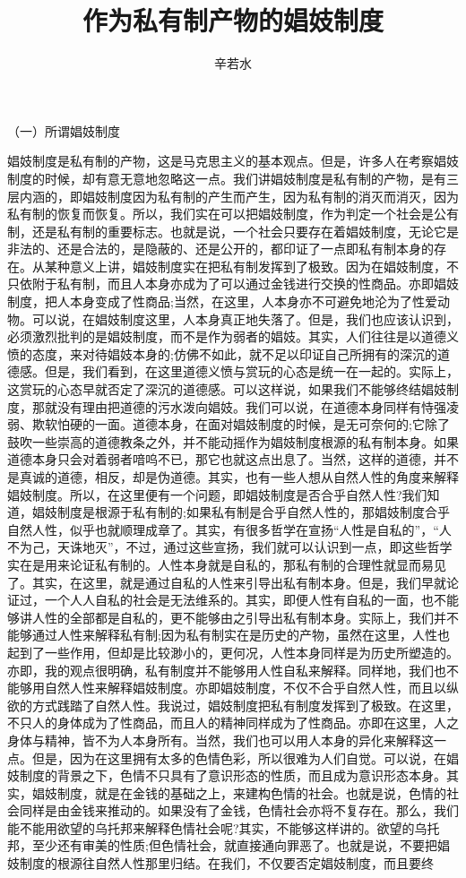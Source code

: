 \documentclass[a4paper]{article}
\date{}
\author{辛若水}
\title{\zihao{-2}\heiti\textbf{作为私有制产物的娼妓制度}}
\begin{document}
    \maketitle

（一）所谓娼妓制度

娼妓制度是私有制的产物，这是马克思主义的基本观点。但是，许多人在考察娼妓制度的时候，却有意无意地忽略这一点。我们讲娼妓制度是私有制的产物，是有三层内涵的，即娼妓制度因为私有制的产生而产生，因为私有制的消灭而消灭，因为私有制的恢复而恢复。所以，我们实在可以把娼妓制度，作为判定一个社会是公有制，还是私有制的重要标志。也就是说，一个社会只要存在着娼妓制度，无论它是非法的、还是合法的，是隐蔽的、还是公开的，都印证了一点即私有制本身的存在。从某种意义上讲，娼妓制度实在把私有制发挥到了极致。因为在娼妓制度，不只依附于私有制，而且人本身亦成为了可以通过金钱进行交换的性商品。亦即娼妓制度，把人本身变成了性商品;当然，在这里，人本身亦不可避免地沦为了性爱动物。可以说，在娼妓制度这里，人本身真正地失落了。但是，我们也应该认识到，必须激烈批判的是娼妓制度，而不是作为弱者的娼妓。其实，人们往往是以道德义愤的态度，来对待娼妓本身的;仿佛不如此，就不足以印证自己所拥有的深沉的道德感。但是，我们看到，在这里道德义愤与赏玩的心态是统一在一起的。实际上，这赏玩的心态早就否定了深沉的道德感。可以这样说，如果我们不能够终结娼妓制度，那就没有理由把道德的污水泼向娼妓。我们可以说，在道德本身同样有恃强凌弱、欺软怕硬的一面。道德本身，在面对娼妓制度的时候，是无可奈何的;它除了鼓吹一些崇高的道德教条之外，并不能动摇作为娼妓制度根源的私有制本身。如果道德本身只会对着弱者喑呜不已，那它也就这点出息了。当然，这样的道德，并不是真诚的道德，相反，却是伪道德。其实，也有一些人想从自然人性的角度来解释娼妓制度。所以，在这里便有一个问题，即娼妓制度是否合乎自然人性?我们知道，娼妓制度是根源于私有制的;如果私有制是合乎自然人性的，那娼妓制度合乎自然人性，似乎也就顺理成章了。其实，有很多哲学在宣扬“人性是自私的”，“人不为己，天诛地灭”，不过，通过这些宣扬，我们就可以认识到一点，即这些哲学实在是用来论证私有制的。人性本身就是自私的，那私有制的合理性就显而易见了。其实，在这里，就是通过自私的人性来引导出私有制本身。但是，我们早就论证过，一个人人自私的社会是无法维系的。其实，即便人性有自私的一面，也不能够讲人性的全部都是自私的，更不能够由之引导出私有制本身。实际上，我们并不能够通过人性来解释私有制;因为私有制实在是历史的产物，虽然在这里，人性也起到了一些作用，但却是比较渺小的，更何况，人性本身同样是为历史所塑造的。亦即，我的观点很明确，私有制度并不能够用人性自私来解释。同样地，我们也不能够用自然人性来解释娼妓制度。亦即娼妓制度，不仅不合乎自然人性，而且以纵欲的方式践踏了自然人性。我说过，娼妓制度把私有制度发挥到了极致。在这里，不只人的身体成为了性商品，而且人的精神同样成为了性商品。亦即在这里，人之身体与精神，皆不为人本身所有。当然，我们也可以用人本身的异化来解释这一点。但是，因为在这里拥有太多的色情色彩，所以很难为人们自觉。可以说，在娼妓制度的背景之下，色情不只具有了意识形态的性质，而且成为意识形态本身。其实，娼妓制度，就是在金钱的基础之上，来建构色情的社会。也就是说，色情的社会同样是由金钱来推动的。如果没有了金钱，色情社会亦将不复存在。那么，我们能不能用欲望的乌托邦来解释色情社会呢?其实，不能够这样讲的。欲望的乌托邦，至少还有审美的性质;但色情社会，就直接通向罪恶了。也就是说，不要把娼妓制度的根源往自然人性那里归结。在我们，不仅要否定娼妓制度，而且要终
\end{document}
